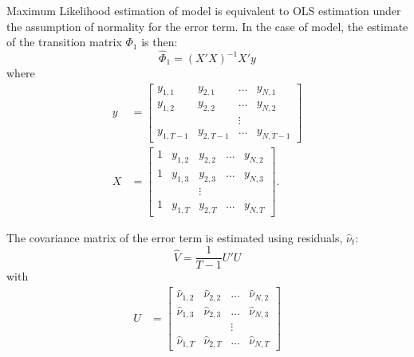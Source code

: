 Maximum Likelihood estimation of \varp{} model is equivalent to OLS estimation under the assumption of normality for the error term. In the case of \varp[1]{} model, the estimate of the transition matrix $\Phi_1$ is then:
\[
    \hat\Phi_1 = (X'X)^{-1} X'y
\]
where
\begin{align*}
    y & = \begin{bmatrix}
              y_{1, 1}   & y_{2, 1}   & \ldots & y_{N, 1}   \\
              y_{1, 2}   & y_{2, 2}   & \ldots & y_{N, 2}   \\
                         &            & \vdots &            \\
              y_{1, T-1} & y_{2, T-1} & \ldots & y_{N, T-1}
          \end{bmatrix}
    \\[0.8cm]
    X & = \begin{bmatrix}
              1 & y_{1, 2} & y_{2, 2} & \ldots & y_{N, 2} \\
              1 & y_{1, 3} & y_{2, 3} & \ldots & y_{N, 3} \\
                &          & \vdots   &                   \\
              1 & y_{1, T} & y_{2, T} & \ldots & y_{N, T}
          \end{bmatrix}.
\end{align*}

The covariance matrix of the error term is estimated using residuals, $\hat \nu_t$:
\[
    \hat V = \frac{1}{T-1} U' U
\]
with
\begin{align*}
    U & = \begin{bmatrix}
              \hat\nu_{1, 2} & \hat\nu_{2, 2} & \ldots & \hat\nu_{N, 2} \\
              \hat\nu_{1, 3} & \hat\nu_{2, 3} & \ldots & \hat\nu_{N, 3} \\
                             &                & \vdots &                \\
              \hat\nu_{1, T} & \hat\nu_{2, T} & \ldots & \hat\nu_{N, T}
          \end{bmatrix}
\end{align*}

